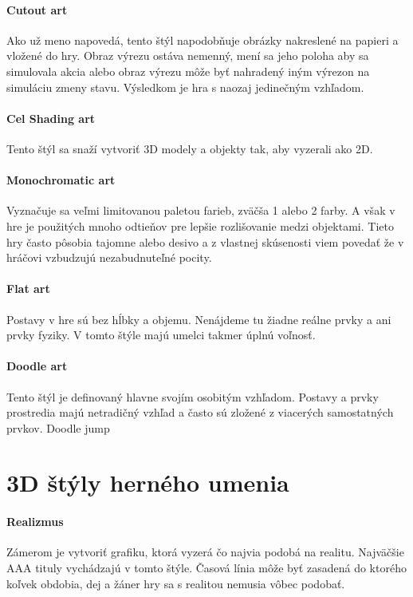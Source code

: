 \documentclass[10pt,twoside,slovak,a4paper]{article}
\begin{document}
\paragraph{Cutout art}
Ako už meno napovedá, tento štýl napodobňuje obrázky nakreslené na papieri a vložené do hry. Obraz výrezu ostáva nemenný, mení sa jeho poloha aby sa simulovala akcia alebo obraz výrezu môže byť nahradený iným výrezon na simuláciu zmeny stavu. Výsledkom je hra s naozaj jedinečným vzhľadom.


\paragraph{Cel Shading art}
Tento štýl sa snaží vytvoriť 3D modely a objekty tak, aby vyzerali ako 2D.


\paragraph{Monochromatic art}
Vyznačuje sa veľmi limitovanou paletou farieb, zväčša 1 alebo 2 farby. A však v hre je použitých mnoho odtieňov pre lepšie rozlišovanie medzi objektami. Tieto hry často pôsobia tajomne alebo desivo a z vlastnej skúsenosti viem povedať že v hráčovi vzbudzujú nezabudnuteľné pocity.

\paragraph{Flat art}
Postavy v hre sú bez hĺbky a objemu. Nenájdeme tu žiadne reálne prvky a ani prvky fyziky. V tomto štýle majú umelci takmer úplnú voľnosť.

\paragraph{Doodle art}
Tento štýl je definovaný hlavne svojím osobitým vzhľadom. Postavy a prvky prostredia majú netradičný vzhľad a často sú zložené z viacerých samostatných prvkov.
Doodle jump


\section{3D štýly herného umenia}

\paragraph{Realizmus}
Zámerom je vytvoriť grafiku, ktorá vyzerá čo najvia podobá na realitu. Najväčšie AAA tituly vychádzajú v tomto štýle. Časová línia môže byť zasadená do ktorého koľvek obdobia, dej a žáner hry sa s realitou nemusia vôbec podobať. 
\end{document}
